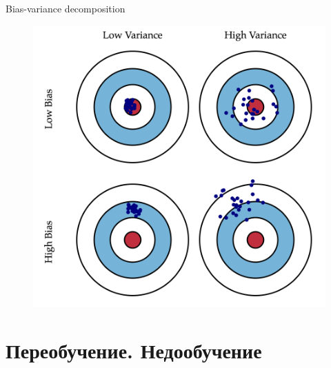 \documentclass{beamer}
\begin{document}
\begin{frame}[fragile]{Bias-variance decomposition}
\begin{figure}[h]
\centering
\includegraphics[scale=0.2]{images/bias-variant.png}
\end{figure}
\end{frame}

\section{Переобучение. Недообучение}
\end{document}
